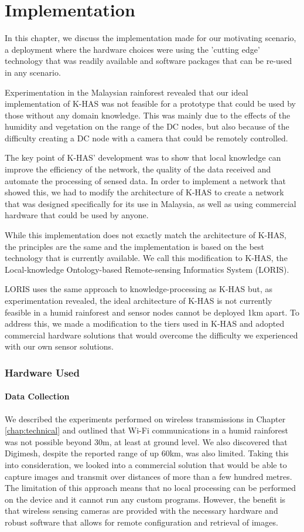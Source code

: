 \chapter{Implementation}
	In this chapter, we discuss the implementation made for our motivating scenario, a deployment where the hardware choices were using the 'cutting edge' technology that was readily available and software packages that can be re-used in any scenario. 
	
	Experimentation in the Malaysian rainforest revealed that our ideal implementation of K-HAS was not feasible for a prototype that could be used by those without any domain knowledge. This was mainly due to the effects of the humidity and vegetation on the range of the DC nodes, but also because of the difficulty creating a DC node with a camera that could be remotely controlled.
	
	The key point of K-HAS' development was to show that local knowledge can improve the efficiency of the network, the quality of the data received and automate the processing of sensed data. In order to implement a network that showed this, we had to modify the architecture of K-HAS to create a network that was designed specifically for its use in Malaysia, as well as using commercial hardware that could be used by anyone. 
	
	While this implementation does not exactly match the architecture of K-HAS, the principles are the same and the implementation is based on the best technology that is currently available. We call this modification to K-HAS, the Local-knowledge Ontology-based Remote-sensing Informatics System (LORIS).
	
	LORIS uses the same approach to knowledge-processing as K-HAS but, as experimentation revealed, the ideal architecture of K-HAS is not currently feasible in a humid rainforest and sensor nodes cannot be deployed 1km apart. To address this, we made a modification to the tiers used in K-HAS and adopted commercial hardware solutions that would overcome the difficulty we experienced with our own sensor solutions.
	
	\subsection{Hardware Used}
		\subsubsection{Data Collection}
			We described the experiments performed on wireless transmissions in Chapter \ref{chap:technical} and outlined that Wi-Fi communications in a humid rainforest was not possible beyond 30m, at least at ground level. We also discovered that Digimesh, despite the reported range of up 60km, was also limited. Taking this into consideration, we looked into a commercial solution that would be able to capture images and transmit over distances of more than a few hundred metres. The limitation of this approach means that no local processing can be performed on the device and it cannot run any custom programs. However, the benefit is that wireless sensing cameras are provided with the necessary hardware and robust software that allows for remote configuration and retrieval of images.
			
